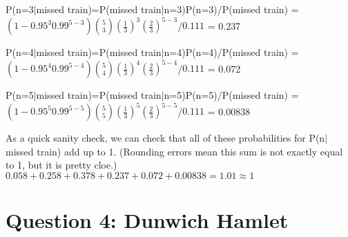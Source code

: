 \documentclass{article}
\begin{document}
\noindent
P(n=3$|$missed train)=P(missed train$|$n=3)P(n=3)/P(missed train)
\newline
\noindent
= $(1-0.95^{3}0.99^{5-3}){5 \choose 3}(\frac{1}{3})^3 (\frac{2}{3})^{5-3}$/$0.111$
\newline 
\noindent
= 0.237
\newline

\noindent
P(n=4$|$missed train)=P(missed train$|$n=4)P(n=4)/P(missed train)
\newline
\noindent
= $(1-0.95^{4}0.99^{5-4}){5 \choose 4}(\frac{1}{3})^4 (\frac{2}{3})^{5-4}$/$0.111$
\newline 
\noindent
= 0.072
\newline


\noindent
P(n=5$|$missed train)=P(missed train$|$n=5)P(n=5)/P(missed train)
\newline
\noindent
= $(1-0.95^{5}0.99^{5-5}){5 \choose 5}(\frac{1}{3})^5 (\frac{2}{3})^{5-5}$/$0.111$
\newline 
\noindent
= 0.00838
\newline

\noindent
As a quick sanity check, we can check that all of these probabilities for P(n$|$missed train) add up to 1. (Rounding errors mean this sum is not exactly equal to 1, but it is pretty cloe.)
\newline
\noindent
$0.058+0.258+0.378+0.237+0.072+0.00838=1.01\approx 1$



\section{Question 4: Dunwich Hamlet}
\end{document}
